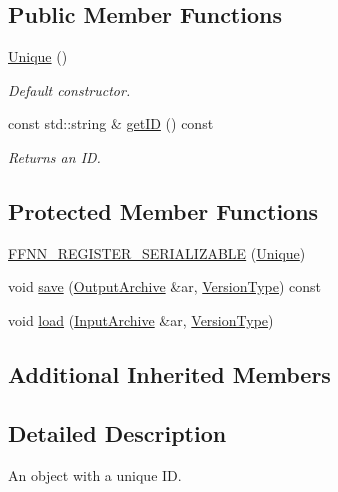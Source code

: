 \subsection*{Public Member Functions}
\begin{DoxyCompactItemize}
\item 
\hyperlink{classffnn_1_1internal_1_1_unique_ad4f80a296525cc5c6c74571ccab94842}{Unique} ()
\begin{DoxyCompactList}\small\item\em Default constructor. \end{DoxyCompactList}\item 
const std\-::string \& \hyperlink{classffnn_1_1internal_1_1_unique_a5723da9af9ff0ff8043e55239fe10f7f}{get\-I\-D} () const 
\begin{DoxyCompactList}\small\item\em Returns an I\-D. \end{DoxyCompactList}\end{DoxyCompactItemize}
\subsection*{Protected Member Functions}
\begin{DoxyCompactItemize}
\item 
\hyperlink{classffnn_1_1internal_1_1_unique_ace4b1ad17d5dbcc4dcd555435753ab4a}{F\-F\-N\-N\-\_\-\-R\-E\-G\-I\-S\-T\-E\-R\-\_\-\-S\-E\-R\-I\-A\-L\-I\-Z\-A\-B\-L\-E} (\hyperlink{classffnn_1_1internal_1_1_unique}{Unique})
\item 
void \hyperlink{classffnn_1_1internal_1_1_unique_a21fd15cd137dd1cccd23a57fb45649f4}{save} (\hyperlink{classffnn_1_1internal_1_1_serializable_acf5baead716eb277337a4437e88a5743}{Output\-Archive} \&ar, \hyperlink{classffnn_1_1internal_1_1_serializable_a32fe7d82b0caf9fe8b6fb7c312a26028}{Version\-Type}) const 
\item 
void \hyperlink{classffnn_1_1internal_1_1_unique_a926ca4f63e3f6f0cf812af7f6ed2d88c}{load} (\hyperlink{classffnn_1_1internal_1_1_serializable_aadc27d79d606f35a82dd88bad33fa6d2}{Input\-Archive} \&ar, \hyperlink{classffnn_1_1internal_1_1_serializable_a32fe7d82b0caf9fe8b6fb7c312a26028}{Version\-Type})
\end{DoxyCompactItemize}
\subsection*{Additional Inherited Members}


\subsection{Detailed Description}
An object with a unique I\-D. 

